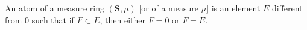 An atom of a measure ring $(\mathbf{S},\mu)$ [or of a measure $\mu$] is an element $E$ different from $0$ such that if $F \subset E$, then either $F = 0$ or $F = E$.
